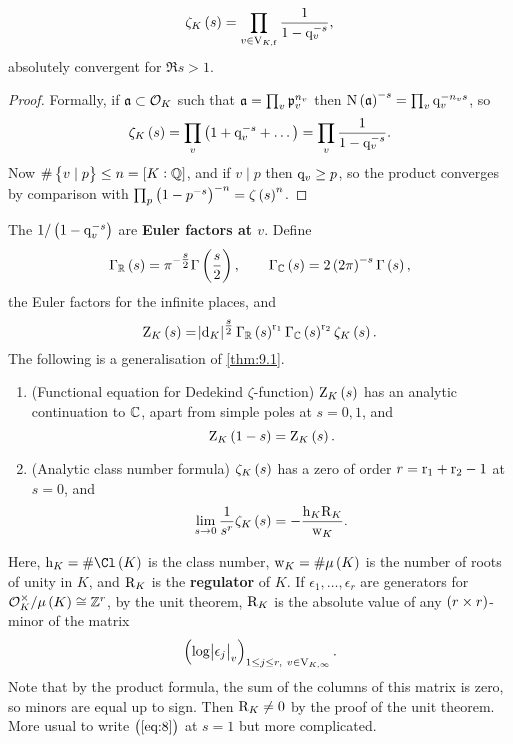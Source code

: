 \begin{proposition}
\label{prop:9.2}
$$ \zeta_K\br{s} = \prod_{v \in \V_{K, \f}} \dfrac{1}{1 - \q_v^{-s}}, $$
absolutely convergent for $ \Re s > 1 $.
\end{proposition}

\begin{proof}
Formally, if $ \mathfrak{a} \subset \mathcal{O}_K $ such that $ \mathfrak{a} = \prod_v \mathfrak{p}_v^{n_v} $ then $ \N\br{\aaa}^{-s} = \prod_v \q_v^{-n_vs} $, so
$$ \zeta_K\br{s} = \prod_v \br{1 + \q_v^{-s} + \dots} = \prod_v \dfrac{1}{1 - \q_v^{-s}}. $$
Now $ \#\cbr{v \mid p} \le n = \sbr{K : \QQ} $, and if $ v \mid p $ then $ \mathrm{q}_v \ge p $, so the product converges by comparison with $ \prod_p \br{1 - p^{-s}}^{-n} = \zeta\br{s}^n $.
\end{proof}

The $ 1 / \br{1 - \q_v^{-s}} $ are \textbf{Euler factors at $ v $}. Define
$$ \Gamma_\RR\br{s} = \pi^{-\tfrac{s}{2}}\Gamma\br{\dfrac{s}{2}}, \qquad \Gamma_\CC\br{s} = 2\br{2\pi}^{-s}\Gamma\br{s}, $$
the Euler factors for the infinite places, and
$$ \Z_K\br{s} = \abs{\d_K}^{\tfrac{s}{2}}\Gamma_\RR\br{s}^{\r_1}\Gamma_\CC\br{s}^{\r_2}\zeta_K\br{s}. $$
The following is a generalisation of \ref{thm:9.1}.

\begin{theorem}
\label{thm:9.3}
\hfill
\begin{enumerate}
\item (Functional equation for Dedekind $ \zeta $-function) $ \Z_K\br{s} $ has an analytic continuation to $ \mathbb{C} $, apart from simple poles at $ s = 0, 1 $, and
$$ \Z_K\br{1 - s} = \Z_K\br{s}. $$
\item (Analytic class number formula) $ \zeta_K\br{s} $ has a zero of order $ r = \mathrm{r}_1 + \mathrm{r}_2 - 1 $ at $ s = 0 $, and
\begin{equation}
\label{eq:8}
\lim_{s \to 0} \dfrac{1}{s^r}\zeta_K\br{s} = -\dfrac{\h_K\R_K}{\w_K}.
\end{equation}
\end{enumerate}
\end{theorem}

Here, $ \h_K = \#\Cl\br{K} $ is the class number, $ \w_K = \#\mu\br{K} $ is the number of roots of unity in $ K $, and $ \mathrm{R}_K $ is the \textbf{regulator} of $ K $. If $ \epsilon_1, \dots, \epsilon_r $ are generators for $ \OOO_K^\times / \mu\br{K} \cong \ZZ^r $, by the unit theorem, $ \mathrm{R}_K $ is the absolute value of any $ \br{r \times r} $-minor of the matrix
$$ \br{\log \abs{\epsilon_j}_v}_{1 \le j \le r, \ v \in \V_{K, \infty}}. $$
Note that by the product formula, the sum of the columns of this matrix is zero, so minors are equal up to sign. Then $ \mathrm{R}_K \ne 0 $ by the proof of the unit theorem. More usual to write $ \br{\ref{eq:8}} $ at $ s = 1 $ but more complicated.

